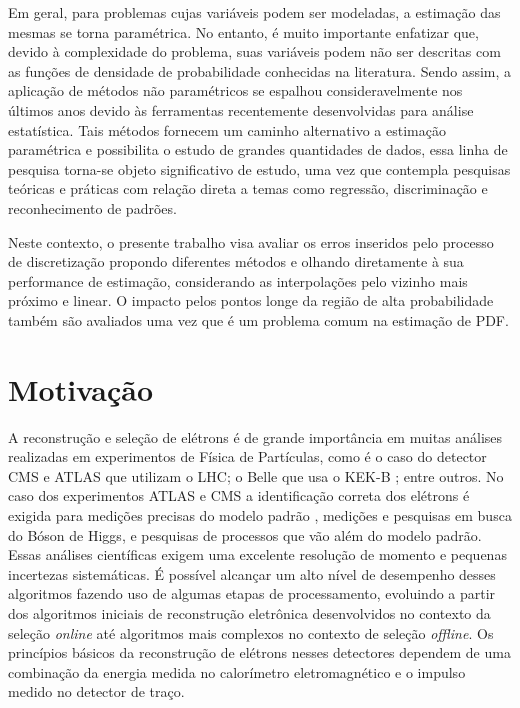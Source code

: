 Em geral, para problemas cujas variáveis podem ser modeladas, a estimação das mesmas se torna paramétrica. No entanto, é muito importante enfatizar que, devido à complexidade do problema, suas variáveis podem não ser descritas com as funções de densidade de probabilidade conhecidas na literatura. Sendo assim, a aplicação de métodos não paramétricos se espalhou consideravelmente nos últimos anos devido às ferramentas recentemente desenvolvidas para análise estatística. Tais métodos  fornecem um caminho alternativo a estimação paramétrica e possibilita o estudo de grandes quantidades de dados, essa linha de pesquisa torna-se objeto significativo de estudo, uma vez que contempla pesquisas teóricas e práticas com relação direta a temas como regressão, discriminação e reconhecimento de padrões. 


Neste contexto, o presente trabalho visa avaliar os erros inseridos pelo processo de discretização propondo diferentes métodos e olhando diretamente à sua performance de estimação, considerando as interpolações pelo vizinho mais próximo e linear. O impacto pelos pontos longe da região de alta probabilidade também são avaliados uma vez que é um problema comum na estimação de \ac{PDF}.

\section{Motivação}


A reconstrução e seleção de elétrons é de grande importância em muitas análises realizadas em experimentos de Física de Partículas, como é o caso do detector \ac{CMS} e \ac{ATLAS} que utilizam o \ac{LHC}; o Belle \cite{hanagaki2002electron} que usa o KEK-B \cite{superk}; entre outros. No caso dos experimentos ATLAS e CMS a identificação correta dos elétrons é exigida para medições precisas do modelo padrão \cite{modelopadrao}, medições e pesquisas em busca do Bóson de Higgs, e pesquisas de processos que vão além do modelo padrão. Essas análises científicas exigem uma excelente resolução de momento e pequenas incertezas sistemáticas. É possível alcançar um alto nível de desempenho desses algoritmos fazendo uso de algumas etapas de processamento, evoluindo a partir dos algoritmos iniciais de reconstrução eletrônica desenvolvidos no contexto da seleção \textit{online} até algoritmos mais complexos no contexto de seleção \textit{offline}. Os princípios básicos da reconstrução de elétrons nesses detectores dependem de uma combinação da energia medida no calorímetro eletromagnético e o impulso medido no detector de traço.


